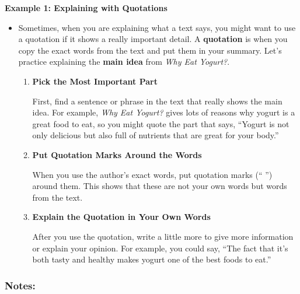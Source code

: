 \documentclass[12pt]{article}
\begin{document}
\vspace{1em}
\begin{tcolorbox}[colframe=black!60, colback=white, 
coltitle=black, colbacktitle=black!15, fonttitle=\bfseries\Large, 
title=Examples, halign title=center, left=10pt, right=10pt, top=10pt, bottom=15pt]

\textbf{Example 1: Explaining with Quotations}
\begin{itemize}
    \item Sometimes, when you are explaining what a text says, you might want to use a quotation if it shows a really important detail. A \textbf{quotation} is when you copy the exact words from the text and put them in your summary. Let's practice explaining the \textbf{main idea} from \textit{Why Eat Yogurt?}.

\begin{enumerate}
    \item \textbf{Pick the Most Important Part}

First, find a sentence or phrase in the text that really shows the main idea. For example, \textit{Why Eat Yogurt?} gives lots of reasons why yogurt is a great food to eat, so you might quote the part that says, “Yogurt is not only delicious but also full of nutrients that are great for your body.” 
    \item \textbf{Put Quotation Marks Around the Words}

When you use the author’s exact words, put quotation marks (“ ”) around them. This shows that these are not your own words but words from the text.
    \item \textbf{Explain the Quotation in Your Own Words}

After you use the quotation, write a little more to give more information or explain your opinion. For example, you could say, “The fact that it's both tasty and healthy makes yogurt one of the best foods to eat.”
\end{enumerate}
 
\end{itemize}

\subsubsection*{Notes:}
\noindent \underline{\hspace{15cm}} \\[1.2cm]
\noindent \underline{\hspace{15cm}} \\[1.2cm]
\noindent \underline{\hspace{15cm}} \\[1.2cm]
\noindent \underline{\hspace{15cm}} \\[1.2cm]
\noindent \underline{\hspace{15cm}}


     \end{tcolorbox}
\end{document}
